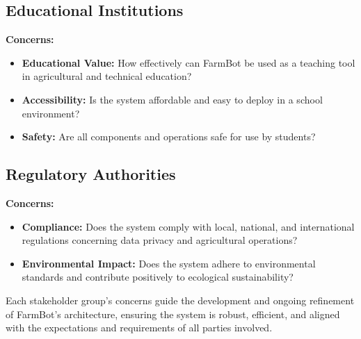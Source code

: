 \subsection{Educational Institutions}
\textbf{Concerns:}
\begin{itemize}
    \item \textbf{Educational Value:} How effectively can FarmBot be used as a teaching tool in agricultural and technical education?
    \item \textbf{Accessibility:} Is the system affordable and easy to deploy in a school environment?
    \item \textbf{Safety:} Are all components and operations safe for use by students?
\end{itemize}

\subsection{Regulatory Authorities}
\textbf{Concerns:}
\begin{itemize}
    \item \textbf{Compliance:} Does the system comply with local, national, and international regulations concerning data privacy and agricultural operations?
    \item \textbf{Environmental Impact:} Does the system adhere to environmental standards and contribute positively to ecological sustainability?
\end{itemize}

Each stakeholder group's concerns guide the development and ongoing refinement of FarmBot's architecture, ensuring the system is robust, efficient, and aligned with the expectations and requirements of all parties involved.





